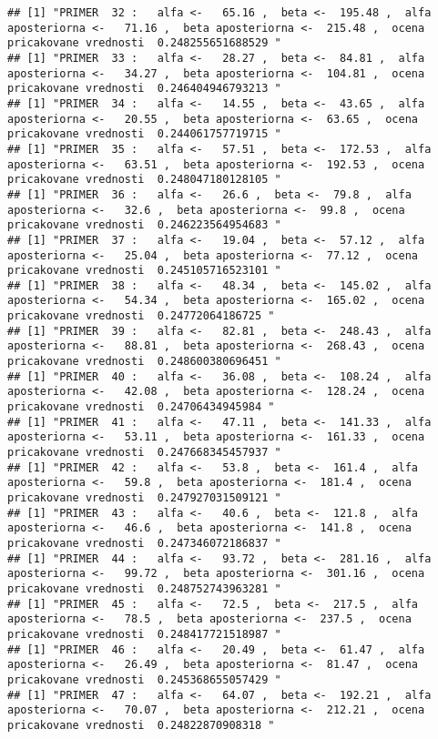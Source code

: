 \documentclass[
]{article}
\begin{document}
\begin{verbatim}
## [1] "PRIMER  32 :   alfa <-   65.16 ,  beta <-  195.48 ,  alfa aposteriorna <-   71.16 ,  beta aposteriorna <-  215.48 ,  ocena pricakovane vrednosti  0.248255651688529 "
## [1] "PRIMER  33 :   alfa <-   28.27 ,  beta <-  84.81 ,  alfa aposteriorna <-   34.27 ,  beta aposteriorna <-  104.81 ,  ocena pricakovane vrednosti  0.246404946793213 "
## [1] "PRIMER  34 :   alfa <-   14.55 ,  beta <-  43.65 ,  alfa aposteriorna <-   20.55 ,  beta aposteriorna <-  63.65 ,  ocena pricakovane vrednosti  0.244061757719715 "
## [1] "PRIMER  35 :   alfa <-   57.51 ,  beta <-  172.53 ,  alfa aposteriorna <-   63.51 ,  beta aposteriorna <-  192.53 ,  ocena pricakovane vrednosti  0.248047180128105 "
## [1] "PRIMER  36 :   alfa <-   26.6 ,  beta <-  79.8 ,  alfa aposteriorna <-   32.6 ,  beta aposteriorna <-  99.8 ,  ocena pricakovane vrednosti  0.246223564954683 "
## [1] "PRIMER  37 :   alfa <-   19.04 ,  beta <-  57.12 ,  alfa aposteriorna <-   25.04 ,  beta aposteriorna <-  77.12 ,  ocena pricakovane vrednosti  0.245105716523101 "
## [1] "PRIMER  38 :   alfa <-   48.34 ,  beta <-  145.02 ,  alfa aposteriorna <-   54.34 ,  beta aposteriorna <-  165.02 ,  ocena pricakovane vrednosti  0.24772064186725 "
## [1] "PRIMER  39 :   alfa <-   82.81 ,  beta <-  248.43 ,  alfa aposteriorna <-   88.81 ,  beta aposteriorna <-  268.43 ,  ocena pricakovane vrednosti  0.248600380696451 "
## [1] "PRIMER  40 :   alfa <-   36.08 ,  beta <-  108.24 ,  alfa aposteriorna <-   42.08 ,  beta aposteriorna <-  128.24 ,  ocena pricakovane vrednosti  0.24706434945984 "
## [1] "PRIMER  41 :   alfa <-   47.11 ,  beta <-  141.33 ,  alfa aposteriorna <-   53.11 ,  beta aposteriorna <-  161.33 ,  ocena pricakovane vrednosti  0.247668345457937 "
## [1] "PRIMER  42 :   alfa <-   53.8 ,  beta <-  161.4 ,  alfa aposteriorna <-   59.8 ,  beta aposteriorna <-  181.4 ,  ocena pricakovane vrednosti  0.247927031509121 "
## [1] "PRIMER  43 :   alfa <-   40.6 ,  beta <-  121.8 ,  alfa aposteriorna <-   46.6 ,  beta aposteriorna <-  141.8 ,  ocena pricakovane vrednosti  0.247346072186837 "
## [1] "PRIMER  44 :   alfa <-   93.72 ,  beta <-  281.16 ,  alfa aposteriorna <-   99.72 ,  beta aposteriorna <-  301.16 ,  ocena pricakovane vrednosti  0.248752743963281 "
## [1] "PRIMER  45 :   alfa <-   72.5 ,  beta <-  217.5 ,  alfa aposteriorna <-   78.5 ,  beta aposteriorna <-  237.5 ,  ocena pricakovane vrednosti  0.248417721518987 "
## [1] "PRIMER  46 :   alfa <-   20.49 ,  beta <-  61.47 ,  alfa aposteriorna <-   26.49 ,  beta aposteriorna <-  81.47 ,  ocena pricakovane vrednosti  0.245368655057429 "
## [1] "PRIMER  47 :   alfa <-   64.07 ,  beta <-  192.21 ,  alfa aposteriorna <-   70.07 ,  beta aposteriorna <-  212.21 ,  ocena pricakovane vrednosti  0.24822870908318 "

\end{verbatim}
\end{document}
